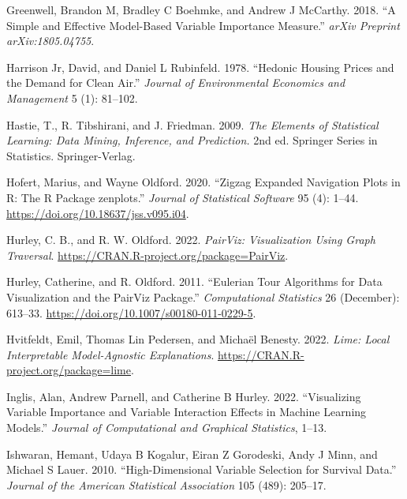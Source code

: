 \begin{CSLReferences}{1}{0}
\leavevmode{}%
Greenwell, Brandon M, Bradley C Boehmke, and Andrew J McCarthy. 2018. {``A Simple and Effective Model-Based Variable Importance Measure.''} \emph{arXiv Preprint arXiv:1805.04755}.

\leavevmode{}%
Harrison Jr, David, and Daniel L Rubinfeld. 1978. {``Hedonic Housing Prices and the Demand for Clean Air.''} \emph{Journal of Environmental Economics and Management} 5 (1): 81--102.

\leavevmode{}%
Hastie, T., R. Tibshirani, and J. Friedman. 2009. \emph{The Elements of Statistical Learning: Data Mining, Inference, and Prediction.} 2nd ed. Springer Series in Statistics. Springer-Verlag.

\leavevmode{}%
Hofert, Marius, and Wayne Oldford. 2020. {``Zigzag Expanded Navigation Plots in {R}: The {R} Package {zenplots}.''} \emph{Journal of Statistical Software} 95 (4): 1--44. \url{https://doi.org/10.18637/jss.v095.i04}.

\leavevmode{}%
Hurley, C. B., and R. W. Oldford. 2022. \emph{PairViz: Visualization Using Graph Traversal}. \url{https://CRAN.R-project.org/package=PairViz}.

\leavevmode{}%
Hurley, Catherine, and R. Oldford. 2011. {``Eulerian Tour Algorithms for Data Visualization and the PairViz Package.''} \emph{Computational Statistics} 26 (December): 613--33. \url{https://doi.org/10.1007/s00180-011-0229-5}.

\leavevmode{}%
Hvitfeldt, Emil, Thomas Lin Pedersen, and Michaël Benesty. 2022. \emph{Lime: Local Interpretable Model-Agnostic Explanations}. \url{https://CRAN.R-project.org/package=lime}.

\leavevmode{}%
Inglis, Alan, Andrew Parnell, and Catherine B Hurley. 2022. {``Visualizing Variable Importance and Variable Interaction Effects in Machine Learning Models.''} \emph{Journal of Computational and Graphical Statistics}, 1--13.

\leavevmode{}%
Ishwaran, Hemant, Udaya B Kogalur, Eiran Z Gorodeski, Andy J Minn, and Michael S Lauer. 2010. {``High-Dimensional Variable Selection for Survival Data.''} \emph{Journal of the American Statistical Association} 105 (489): 205--17.


\end{CSLReferences}
